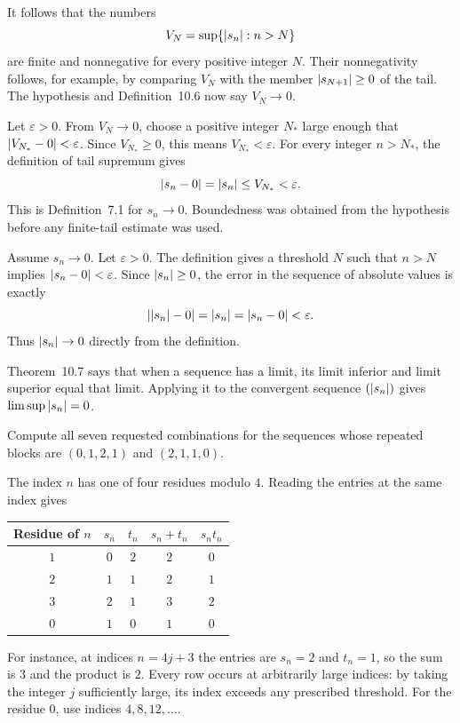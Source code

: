 It follows that the numbers
\[
 V_N=\sup\{\left|s_n\right|:n>N\}
\]
are finite and nonnegative for every positive integer $N$.
Their nonnegativity follows, for example, by comparing $V_N$ with
the member $\left|s_{N+1}\right|\ge0$ of the tail.
The hypothesis and Definition~10.6 now say $V_N\to0$.

Let $\varepsilon>0$. From $V_N\to0$, choose a positive integer $N_*$
large enough that $\left|V_{N_*}-0\right|<\varepsilon$.
Since $V_{N_*}\ge0$, this means $V_{N_*}<\varepsilon$.
For every integer $n>N_*$, the definition of tail supremum gives
\[
 \left|s_n-0\right|=\left|s_n\right|\le V_{N_*}<\varepsilon.
\]
This is Definition~7.1 for $s_n\to0$. Boundedness was obtained from
the hypothesis before any finite-tail estimate was used.

Assume $s_n\to0$. Let $\varepsilon>0$. The definition gives a
threshold $N$ such that $n>N$ implies $\left|s_n-0\right|<\varepsilon$.
Since $\left|s_n\right|\ge0$, the error in the sequence of absolute values
is exactly
\[
 \left|\left|s_n\right|-0\right|=\left|s_n\right|=\left|s_n-0\right|<\varepsilon.
\]
Thus $\left|s_n\right|\to0$ directly from the definition.

Theorem~10.7 says that when a sequence has a limit, its limit
inferior and limit superior equal that limit. Applying it to the
convergent sequence $(\left|s_n\right|)$ gives $\limsup\left|s_n\right|=0$.



\goal Compute all seven requested combinations for the sequences
whose repeated blocks are $(0,1,2,1)$ and $(2,1,1,0)$.

The index $n$ has one of four residues modulo $4$. Reading the
entries at the same index gives
\begin{center}
\begin{tabular}{@{}ccccc@{}}
\toprule
Residue of $n$ & $s_n$ & $t_n$ & $s_n+t_n$ & $s_nt_n$\\
\midrule
$1$ & $0$ & $2$ & $2$ & $0$\\
$2$ & $1$ & $1$ & $2$ & $1$\\
$3$ & $2$ & $1$ & $3$ & $2$\\
$0$ & $1$ & $0$ & $1$ & $0$\\
\bottomrule
\end{tabular}
\end{center}
For instance, at indices $n=4j+3$ the entries are $s_n=2$ and
$t_n=1$, so the sum is $3$ and the product is $2$.
Every row occurs at arbitrarily large indices: by taking the integer
$j$ sufficiently large, its index exceeds any prescribed threshold.
For the residue $0$, use indices $4,8,12,\ldots$.

